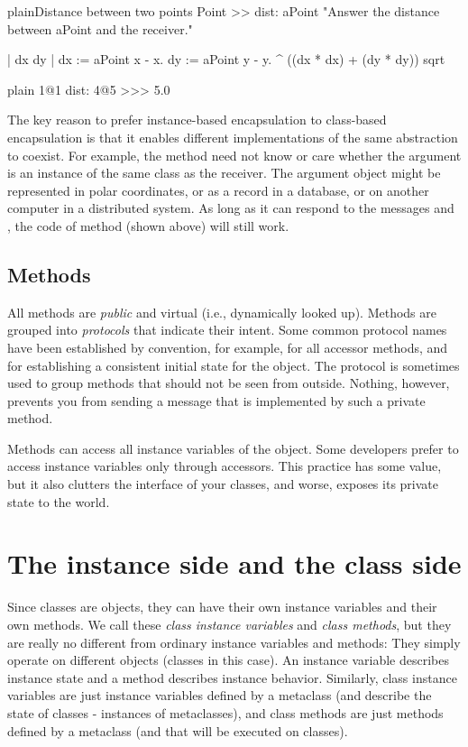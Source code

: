 \documentclass[10pt,twoside,english]{_support/latex/sbabook/sbabook}
\begin{document}
\begin{listing}[float, label=scr:distance]{plain}{Distance between two points}
Point >> dist: aPoint
    "Answer the distance between aPoint and the receiver."

    | dx dy |
    dx := aPoint x - x.
    dy :=  aPoint y - y.
    ^ ((dx * dx) + (dy * dy)) sqrt
\end{listing}

\begin{displaycode}{plain}
1@1 dist: 4@5
>>> 5.0
\end{displaycode}

The key reason to prefer instance-based encapsulation to class-based
encapsulation is that it enables different implementations of the same
abstraction to coexist. For example, the method  need not know or care
whether the argument  is an instance of the same class as the
receiver. The argument object might be represented in polar coordinates, or as a
record in a database, or on another computer in a distributed system. As long as
it can respond to the messages  and , the code of method 
(shown above) will still work.
\section{Methods}
All methods are \textit{public} and virtual (i.e., dynamically looked up). Methods
are grouped into \textit{protocols} that indicate their intent. Some common protocol
names have been established by convention, for example,  for all
accessor methods, and  for establishing a consistent initial
state for the object. The protocol  is sometimes used to group
methods that should not be seen from outside. Nothing, however, prevents you
from sending a message that is implemented by such a private method.

Methods can access all instance variables of the object. Some developers prefer
to access instance variables only through accessors. This practice has some
value, but it also clutters the interface of your classes, and worse, exposes
its private state to the world.
\chapter{The instance side and the class side}
Since classes are objects, they can have their own instance variables and their
own methods. We call these \textit{class instance variables} and \textit{class methods},
but they are really no different from ordinary instance variables and methods:
They simply operate on different objects (classes in this case). An instance
variable describes instance state and a method describes instance behavior.
Similarly, class instance variables are just instance variables defined by a
metaclass (and describe the state of classes - instances of metaclasses), and
class methods are just methods defined by a metaclass (and that will be executed
on classes).
\end{document}
